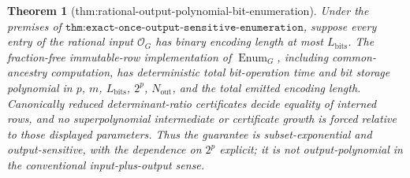 \documentclass{article}
\newtheorem{theorem}{Theorem}
\begin{document}
\begin{theorem}[thm:rational-output-polynomial-bit-enumeration]\label{thm:rational-output-polynomial-bit-enumeration}
Under the premises of \(\texttt{thm:exact-once-output-sensitive-enumeration}\), suppose every entry of the rational input \(\mathcal O_G\) has binary encoding length at most \(L_{\mathrm{bits}}\). The fraction-free immutable-row implementation of \(\operatorname{Enum}_G\), including common-ancestry computation, has deterministic total bit-operation time and bit storage polynomial in \(p\), \(m\), \(L_{\mathrm{bits}}\), \(2^p\), \(N_{\mathrm{out}}\), and the total emitted encoding length. Canonically reduced determinant-ratio certificates decide equality of interned rows, and no superpolynomial intermediate or certificate growth is forced relative to those displayed parameters. Thus the guarantee is subset-exponential and output-sensitive, with the dependence on \(2^p\) explicit; it is not output-polynomial in the conventional input-plus-output sense.
\end{theorem}
\end{document}

